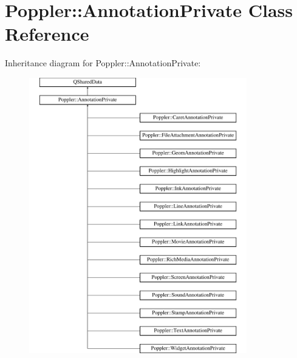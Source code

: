 \hypertarget{class_poppler_1_1_annotation_private}{}\section{Poppler\+:\+:Annotation\+Private Class Reference}
\label{class_poppler_1_1_annotation_private}
Inheritance diagram for Poppler\+:\+:Annotation\+Private\+:\begin{figure}[H]
\begin{center}
\leavevmode
\includegraphics[height=12.000000cm]{class_poppler_1_1_annotation_private}
\end{center}
\end{figure}
